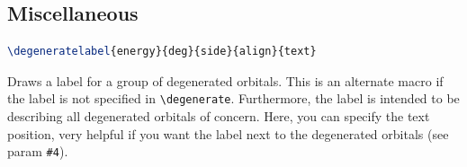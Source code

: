\documentclass[12pt, a4paper]{article}
\begin{document}
\subsection{Miscellaneous}

\begin{lstlisting}[language=TeX]
\degeneratelabel{energy}{deg}{side}{align}{text}
\end{lstlisting}
Draws a label for a group of degenerated orbitals. This is an alternate macro if the label is not specified in \texttt{\textbackslash degenerate}. Furthermore, the label is intended to be describing all degenerated orbitals of concern. Here, you can specify the text position, very helpful if you want the label next to the degenerated orbitals (see param \texttt{\#4}).

\newcommand{\previewdegeneratelabel}[1]{
    \colorbox{lightgray}{
        \begin{mohelper}[scale=0.6]
            \degenerate{0}{/pair}{left}
            \degeneratelabel{0}{1}{left}{left}{}
            \degeneratelabel{0}{1}{left}{right}{}
            \degeneratelabel{0}{1}{left}{bottom}{}
            \degeneratelabel{0}{1}{left}{top}{}
            \degeneratelabel{0}{1}{left}{#1}{$\color{blue}{1a_{1g}}$}
        \end{mohelper}
    }
}
\end{document}
